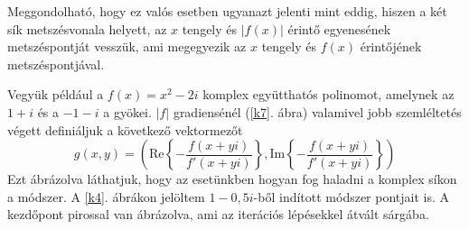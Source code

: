 \documentclass[a4paper,12pt]{report}
\begin{document}
			Meggondolható, hogy ez valós esetben ugyanazt jelenti mint eddig, hiszen a két sík metszésvonala helyett, az $x$ tengely és $|f(x)|$ érintő egyenesének metszéspontját vesszük, ami megegyezik az $x$ tengely és $f(x)$ érintőjének metszéspontjával.

			Vegyük például a $f(x)=x^2-2i$ komplex együtthatós polinomot, amelynek az $1+i$ és a $-1-i$ a gyökei. $|f|$ gradiensénél (\ref{k7}. ábra) valamivel jobb szemléltetés végett definiáljuk a következő vektormezőt
			\[g(x,y)=\left(\mathrm{Re} \left\{ -\frac{f(x+yi)}{f'(x+yi)} \right \} ,\mathrm{Im} \left\{-\frac{f(x+yi)}{f'(x+yi)}\right \} \right)\]
			Ezt ábrázolva láthatjuk, hogy az esetünkben hogyan fog haladni a komplex síkon a módszer. A \ref{k4}. ábrákon jelöltem $1-0,\!5i$-ből indított módszer pontjait is. A kezdőpont pirossal van ábrázolva, ami az iterációs lépésekkel átvált sárgába.
			
\end{document}
